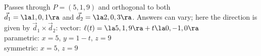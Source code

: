 {Passes through $P=(5,1,9)$ and orthogonal to both\\ $\vec d_1=\la 1,0,1\ra$ and $\vec d_2=\la 2,0,3\ra$.
}
{Answers can vary; here the direction is given by $\vec d_1\times \vec d_2$:
vector: $\ell(t) = \la 5,1,9\ra + t\la 0,-1,0\ra$\\
parametric: $x= 5$, $y=1-t$, $z = 9$\\
symmetric: $x=5$, $z=9$
}

